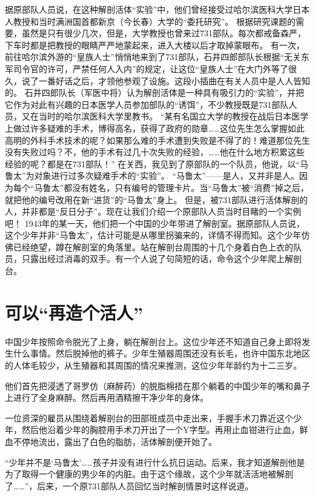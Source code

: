 \documentclass[a4paper,12pt,UTF8,twoside]{ctexbook}
\begin{document}
据原部队人员说，在这种解剖活体“实验”中，他们曾经接受过哈尔滨医科大学日本人教授和当时满洲国首都新京（今长春）大学的“委托研究”。
根据研究课题的需要，虽然是只有很少几次，但是，大学教授也曾来过731部队。每次都戒备森严，下车时都是把教授的眼睛严严地蒙起来，进入大楼以后才取掉蒙眼布。
有一次，前往哈尔滨外游的“皇族人士”悄悄地来到了731部队，石井四郎部队长根据“无关东军司令官的许可，严禁任何人入内”的规定，让这位“皇族人士”在大门外等了很久，说了一番好话之后，才领他参观了设施。这段小插曲在有关人员中是人人皆知的。
石井四郎队长（军医中将）认为解剖活体是一种具有吸引力的“实验”，并把它作为对此有兴趣的日本医学人员参加部队的“诱饵”，不少教授既是731部队人员，又在当时的哈尔滨医科大学里教书。
“某有名国立大学的教授在战后日本医学上做过许多疑难的手术，博得高名，获得了政府的勋章……这位先生怎么掌握如此高明的外科手术技术的呢？如果那么难的手术遭到失败是不得了的！难道那位先生没有失败过吗？不，他的手术有过几十次失败的经验，……他在什么地方积累这些经验的呢？都是在731部队！”
在关西，我见到了原部队的一个队员，他说，以“马鲁太”为对象进行过多次疑难手术的“实验”。
“马鲁太”——是人，又并非是人。因为每个“马鲁太”都没有姓名，只有编号的管理卡片。当“马鲁太”被“消费”掉之后，就把他的编号改用在新“进货”的“马鲁太”身上。
但是，被731部队进行活体解剖的人，并非都是“反日分子”。现在让我们介绍一个原部队人员当时目睹的一个实例吧！
1943年的某一天，他们把一个中国的少年带进了解剖室。据原部队人员说，这个少年并非“马鲁太”，估计可能是从哪里拐骗来的，详情不得而知。这个少年仿佛已经绝望，蹲在解剖室的角落里。站在解剖台周围的十几个身着白色上衣的队员，只露出经过消毒的双手。有一个人说了句简短的话，命令这个少年爬上解剖台。

\section{可以“再造个活人”}

中国少年按照命令脱光了上身，躺在解剖台上。这位少年还不知道自己身上即将发生什么事情。然后脱掉他的裤子。少年生殖器周围还没有长毛，也许中国东北地区的人体毛较少，从生殖器和其周围的情况来推测，这位少年年龄约为十二三岁。

他们首先把浸透了哥罗仿（麻醉药）的脱脂棉捂在那个躺着的中国少年的嘴和鼻子上进行了全身麻醉。然后再用酒精擦干净少年的身体。

一位资深的雇员从围绕着解剖台的田部班成员中走出来，手握手术刀靠近这个少年，然后他沿着少年的胸腔用手术刀开出了一个Y字型。再用止血钳进行止血，鲜血不停地流出，露出了白色的脂肪，活体解剖便开始了。

“少年并不是‘马鲁太’……孩子并没有进行什么抗日运动。后来，我才知道解剖他是为了取得一个健康的男少年的内脏。由于这个缘故，这个少年就活活地被解剖了……”，后来，一个原731部队人员回忆当时解剖情景时这样说道。
\end{document}
